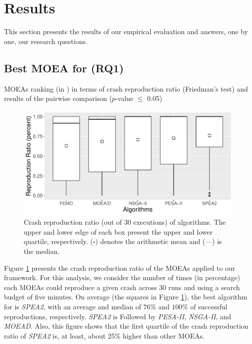 
\section{Results}
\label{sec:results}
This section presents the results of our empirical evaluation and answers, one by one, our research questions.

\subsection{Best MOEA for \moho (RQ1)} 
\label{sec:results:rq1}

\begin{table} [t]
    \centering
    \caption{MOEAs ranking (in \moho) in  terms of crash reproduction ratio (Friedman's test) and results of the pairwise comparison ($p$-value $\leq$ 0.05)}
    \label{tab:internal-assessment}
    
\end{table}

\begin{figure}[t]
    \centering
    \includegraphics[width=\linewidth]{papers/moho/figures/reproduction-overall.pdf}
    \caption{Crash reproduction ratio (out of 30 executions) of \moho algorithms.  The upper and lower edge of each box present the upper and lower quartile, respectively. ($\square$) denotes the arithmetic mean and (---) is the median.}
    \label{fig:eval:results-rq1-overall}
\end{figure}

Figure \ref{fig:eval:results-rq1-overall} presents the crash reproduction ratio of the MOEAs applied to our \moho framework. For this analysis, we consider the number of times (in percentage) each MOEAs could reproduce a given crash across 30 runs and using a search budget of five minutes. On average (the squares in Figure \ref{fig:eval:results-rq1-overall}), the best algorithm for \moho is  \textit{SPEA2}, with an average and median of $76\%$ and $100\%$ of successful reproductions, respectively. \textit{SPEA2} is Followed by \textit{PESA-II}, \textit{NSGA-II}, and \textit{MOEAD}. Also, this figure shows that the first quartile of the crash reproduction ratio of \textit{SPEA2} is, at least, about 25\% higher than other MOEAs.


